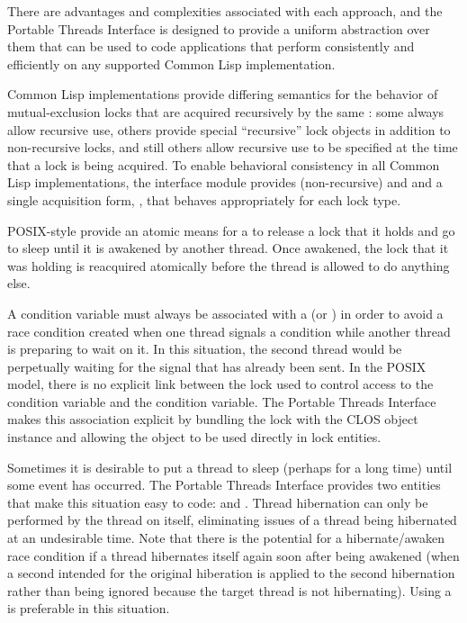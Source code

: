 \documentclass[10pt,twoside,english,pdftex]{article}
\begin{document}
There are advantages and complexities associated with each approach, and the
Portable Threads Interface is designed to provide a uniform abstraction over
them that can be used to code applications that perform consistently and
efficiently on any supported Common Lisp implementation.


Common Lisp implementations provide differing semantics for the behavior of
mutual-exclusion locks that are acquired recursively by the same
: some always allow recursive use, others provide special
``recursive'' lock objects in addition to non-recursive locks, and still
others allow recursive use to be specified at the time that a lock is being
acquired.  To enable behavioral consistency in all Common Lisp
implementations, the  interface module provides
(non-recursive)  and  and a single
acquisition form, , that behaves
appropriately for each lock type.


POSIX-style  provide an atomic means for a
 to release a lock that it holds and go to sleep until it is
awakened by another thread.  Once awakened, the lock that it was holding is
reacquired atomically before the thread is allowed to do anything else.

A condition variable must always be associated with a  (or
) in order to avoid a race condition created when one
thread signals a condition while another thread is preparing to wait on it.
In this situation, the second thread would be perpetually waiting for the
signal that has already been sent.  In the POSIX model, there is no explicit
link between the lock used to control access to the condition variable and the
condition variable.  The Portable Threads Interface makes this association
explicit by bundling the lock with the
 CLOS object instance and allowing
the  object to be used directly in
lock entities.


Sometimes it is desirable to put a thread to sleep (perhaps for a long time) until some event has occurred.  The Portable Threads Interface provides two entities that make this situation easy to code:  and .  Thread hibernation can only be performed by the thread on itself, eliminating issues of a thread being hibernated at an undesirable time.  Note that there is the potential for a hibernate/awaken race condition if a thread hibernates itself again soon after being awakened (when a second  intended for the original hiberation is applied to the second hibernation rather than being ignored because the target thread is not hibernating).  Using a  is preferable in this situation.
\end{document}
